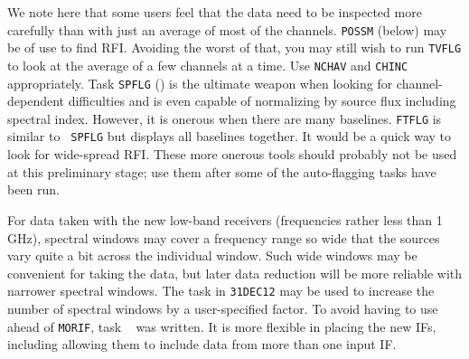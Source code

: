 
We note here that some users feel that the data need to be inspected
more carefully than with just an average of most of the channels.
{\tt POSSM} (below) may be of use to find RFI\@.  Avoiding the worst
of that, you may still wish to run {\tt TVFLG} to look at the average
of a few channels at a time.  Use {\tt NCHAV} and {\tt CHINC}
appropriately.  Task {\tt SPFLG} () is the ultimate weapon
when looking for channel-dependent difficulties and is even capable of
normalizing by source flux including spectral index.  However, it is
onerous when there are many baselines.  {\tt FTFLG} is similar to {\tt
SPFLG} but displays all baselines together.  It would be a quick way
to look for wide-spread RFI\@.  These more onerous tools should
probably not be used at this preliminary stage; use them after some of
the auto-flagging tasks have been run.


For data taken with the new low-band receivers (frequencies rather
less than 1 GHz), spectral windows may cover a frequency range so wide
that the sources vary quite a bit across the individual window.  Such
wide windows may be convenient for taking the data, but later data
reduction will be more reliable with narrower spectral windows.  The
task {\tt {}} in {\tt 31DEC12} may be used to increase the
number of spectral windows by a user-specified factor.  To avoid
having to use {\tt {}} ahead of {\tt MORIF}, task {\tt
{}} was written.  It is more flexible in placing the new
IFs, including allowing them to include data from more than one input
IF\@.

